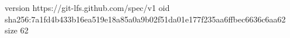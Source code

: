 version https://git-lfs.github.com/spec/v1
oid sha256:7a1fd4b433b16ea519e18a85a0a9b02f51da01e177f235aa6ffbec6636c6aa62
size 62
